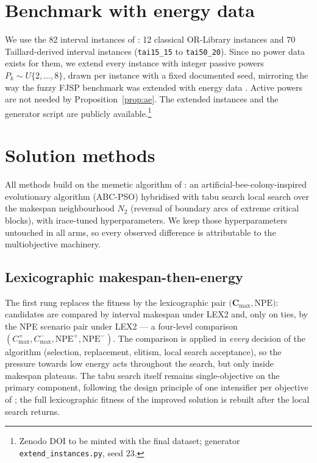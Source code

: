 \documentclass[preprint,12pt]{elsarticle}
\newcommand{\NPE}{\mathrm{NPE}}
\begin{document}
\section{Benchmark with energy data}
\label{sec:benchmark}

We use the 82 interval instances of \cite{DiazTabu2026}: 12 classical
OR-Library instances and 70 Taillard-derived interval instances
(\texttt{tai15\_15} to \texttt{tai50\_20}). Since no power data exists for
them, we extend every instance with integer passive powers
$P_k\sim U\{2,\dots,8\}$, drawn per instance with a fixed documented seed,
mirroring the way the fuzzy FJSP benchmark was extended with energy data
\cite{GarciaGomez2023}. Active powers are not needed by
Proposition~\ref{prop:ae}. The extended instances and the generator script
are publicly available.\footnote{Zenodo DOI to be minted with the final
dataset; generator \texttt{extend\_instances.py}, seed $23$.}

\section{Solution methods}
\label{sec:methods}

All methods build on the memetic algorithm of \cite{DiazTabu2026}: an
artificial-bee-colony-inspired evolutionary algorithm (ABC-PSO) hybridised
with tabu search local search over the makespan neighbourhood $N_2$
(reversal of boundary arcs of extreme critical blocks), with irace-tuned
hyperparameters. We keep those hyperparameters untouched in all arms, so
every observed difference is attributable to the multiobjective machinery.

\subsection{Lexicographic makespan-then-energy}
\label{sec:lex}

The first rung replaces the fitness by the lexicographic pair
$\bigl(\mathbf{C}_{\max},\mathbf{\NPE}\bigr)$: candidates are compared by
interval makespan under LEX2 and, only on ties, by the NPE scenario pair
under LEX2
--- a four-level comparison
$(C^+_{\max},C^-_{\max},\NPE^+,\NPE^-)$. The comparison is applied in
\emph{every} decision of the algorithm (selection, replacement, elitism,
local search acceptance), so the pressure towards low energy acts
throughout the search, but only inside makespan plateaus. The tabu search
itself remains single-objective on the primary component, following the
design principle of one intensifier per objective of \cite{Afsar2022}; the
full lexicographic fitness of the improved solution is rebuilt after the
local search returns.
\end{document}
